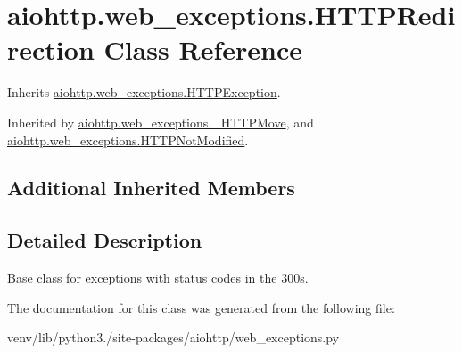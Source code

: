 \hypertarget{classaiohttp_1_1web__exceptions_1_1_h_t_t_p_redirection}{}\section{aiohttp.\+web\+\_\+exceptions.\+H\+T\+T\+P\+Redirection Class Reference}
\label{classaiohttp_1_1web__exceptions_1_1_h_t_t_p_redirection}


Inherits \hyperlink{classaiohttp_1_1web__exceptions_1_1_h_t_t_p_exception}{aiohttp.\+web\+\_\+exceptions.\+H\+T\+T\+P\+Exception}.



Inherited by \hyperlink{classaiohttp_1_1web__exceptions_1_1___h_t_t_p_move}{aiohttp.\+web\+\_\+exceptions.\+\_\+\+H\+T\+T\+P\+Move}, and \hyperlink{classaiohttp_1_1web__exceptions_1_1_h_t_t_p_not_modified}{aiohttp.\+web\+\_\+exceptions.\+H\+T\+T\+P\+Not\+Modified}.

\subsection*{Additional Inherited Members}


\subsection{Detailed Description}
\begin{DoxyVerb}Base class for exceptions with status codes in the 300s.\end{DoxyVerb}
 

The documentation for this class was generated from the following file\+:\begin{DoxyCompactItemize}
\item 
venv/lib/python3./site-\/packages/aiohttp/web\+\_\+exceptions.\+py\end{DoxyCompactItemize}
